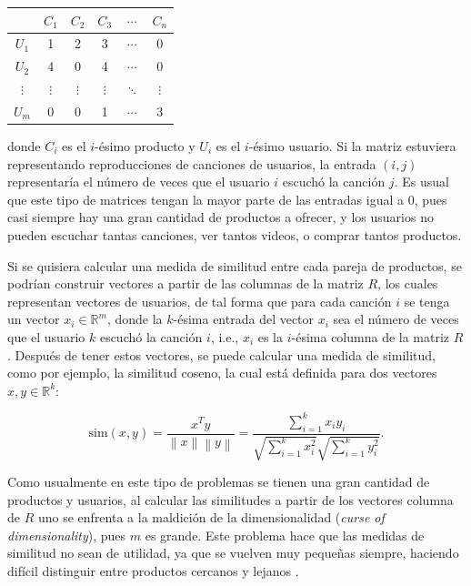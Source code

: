 \documentclass[conference]{IEEEtran}
\newcommand{\norm}[1]{\left\lVert#1\right\rVert}
\begin{document}
\begin{center}
    \begin{tabular}{ c | c  c c c c}
        & $C_1$ & $C_2$ & $C_3$ & $\cdots$ & $C_n$ \\
      \hline                       
      $U_1$ &   1 &     2 &     3 & $\cdots$ &      0 \\
      $U_2$ &   4 &     0 &     4 & $\cdots$  &     0\\
      $\vdots$ & $\vdots$ & $\vdots$ & $\vdots$ & $\ddots$ & $\vdots$\\
      $U_m$ &   0 &     0 &     1 & $\cdots$ &      3\\
      \hline  
    \end{tabular}
\end{center}


donde $C_i$ es el $i$-ésimo producto y $U_i$ es el $i$-ésimo usuario. Si la matriz estuviera representando reproducciones de canciones de usuarios, la entrada $(i, j)$ representaría el número de veces que el usuario $i$ escuchó la canción $j$. Es usual que este tipo de matrices tengan la mayor parte de las entradas igual a $0$, pues casi siempre hay una gran cantidad de productos a ofrecer, y los usuarios no pueden escuchar tantas canciones, ver tantos videos, o comprar tantos productos.

Si se quisiera calcular una medida de similitud entre cada pareja de productos, se podrían construir vectores a partir de las columnas de la matriz $R$, los cuales representan vectores de usuarios, de tal forma que para cada canción $i$ se tenga un vector $x_i \in \mathbb{R}^m$, donde la $k$-ésima entrada del vector $x_i$ sea el número de veces que el usuario $k$ escuchó la canción $i$, i.e., $x_i$ es la $i$-ésima columna de la matriz $R$. Después de tener estos vectores, se puede calcular una medida de similitud, como por ejemplo, la similitud coseno, la cual está definida para dos vectores $x, y \in \mathbb{R}^k$:

\begin{equation}
\label{eq:cosine_sim}
    \mathrm{sim}(x, y) = \frac{x^T y}{\norm{x} \norm{y}} = \frac{\sum_{i = 1}^k x_i y_i}{\sqrt{\sum_{i = 1}^k x_i^2}\sqrt{\sum_{i = 1}^k y_i^2}}.
\end{equation}

Como usualmente en este tipo de problemas se tienen una gran cantidad de productos y usuarios, al calcular las similitudes a partir de los vectores columna de $R$ uno se enfrenta a la maldición de la dimensionalidad (\textit{curse of dimensionality}), pues $m$ es grande. Este problema hace que las medidas de similitud no sean de utilidad, ya que se vuelven muy pequeñas siempre, haciendo difícil distinguir entre productos cercanos y lejanos  \cite{beyer1999nearest}.
\end{document}

